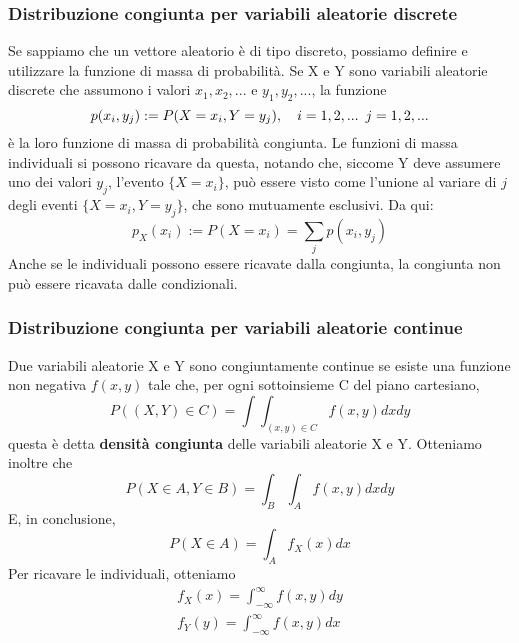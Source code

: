\documentclass[11pt]{article}
\begin{document}
\subsubsection{Distribuzione congiunta per variabili aleatorie discrete}
Se sappiamo che un vettore aleatorio è di tipo discreto, possiamo definire e utilizzare la funzione di massa di probabilità.
Se X e Y sono variabili aleatorie discrete che assumono i valori $x_1, x_2,...$ e $y_1,y_2,...$, la funzione
\begin{displaymath}
    p(x_i, y_j) := P(X=x_i, Y=y_j),\hspace{10px}i=1,2,...\hspace{5px}j=1,2,...
\end{displaymath}
è la loro funzione di massa di probabilità congiunta.
Le funzioni di massa individuali si possono ricavare da questa, notando che, siccome Y deve assumere uno dei valori $y_j$, l'evento $\{X=x_i\}$, può essere visto come l'unione al variare di $j$ degli eventi $\{X=x_i, Y=y_j\}$, che sono mutuamente esclusivi. Da qui:
\begin{displaymath}
    p_X(x_i) := P(X=x_i) = \sum_j p(x_i, y_j)
\end{displaymath}
Anche se le individuali possono essere ricavate dalla congiunta, la congiunta non può essere ricavata dalle condizionali. 
\subsubsection{Distribuzione congiunta per variabili aleatorie continue}
Due variabili aleatorie X e Y sono congiuntamente continue se esiste una funzione non negativa $f(x,y)$ tale che, per ogni sottoinsieme C del piano cartesiano,
\begin{displaymath}
    P((X,Y)\in C) = \int\int_{(x,y)\in C} f(x,y)dxdy
\end{displaymath}
questa è detta \textbf{densità congiunta} delle variabili aleatorie X e Y.
Otteniamo inoltre che
\begin{displaymath}
    P(X \in A, Y \in B) = \int_B\int_A f(x,y)dxdy
\end{displaymath} 
E, in conclusione,
\begin{displaymath}
    P(X \in A) = \int_A f_X(x) dx
\end{displaymath}
Per ricavare le individuali, otteniamo
\begin{gather*}
    f_X(x) =\int_{-\infty}^\infty f(x,y) dy\\
    f_Y(y) =\int_{-\infty}^\infty f(x,y) dx
\end{gather*}
\end{document}
